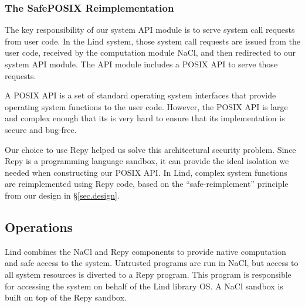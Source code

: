 
\subsubsection{The SafePOSIX Reimplementation}

The key responsibility of our system API module is to serve system call requests from user code.
In the Lind system, those system call requests are issued from the user code,
received by the computation module NaCl, and then redirected to our system API module.
The API module includes a POSIX API to serve those requests.

A POSIX API is a set of standard operating system interfaces that provide operating system functions
to the user code. However, the POSIX API is large and complex enough that its is
very hard to ensure that its implementation is secure and bug-free.

Our choice to use Repy helped us solve this architectural security problem.
Since Repy is a programming language sandbox, it can provide the ideal isolation
we needed when constructing our POSIX API. In Lind,
complex system functions are reimplemented using Repy code,
based on the ``safe-reimplement'' principle from our design in \S{\ref{sec.design}}.

\subsection{Operations}

Lind combines the NaCl and Repy components to provide native computation and
safe access to the system. Untrusted programs are run in NaCl,
but access to all system resources is diverted to a Repy program.
This program is responsible for accessing the system on behalf of the Lind library
 OS. A NaCl sandbox is built on top of the Repy sandbox.

